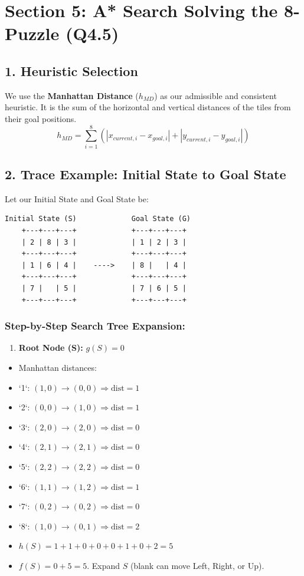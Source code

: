 \section{Section 5: A* Search Solving the 8-Puzzle (Q4.5)}

\subsection{1. Heuristic Selection}
We use the \textbf{Manhattan Distance} ($h_{MD}$) as our admissible and consistent heuristic. It is the sum of the horizontal and vertical distances of the tiles from their goal positions.
\[ h_{MD} = \sum_{i=1}^{8} \left( |x_{current, i} - x_{goal, i}| + |y_{current, i} - y_{goal, i}| \right) \]

\subsection{2. Trace Example: Initial State to Goal State}
Let our Initial State and Goal State be:
\begin{lstlisting}
Initial State (S)             Goal State (G)
    +---+---+---+             +---+---+---+
    | 2 | 8 | 3 |             | 1 | 2 | 3 |
    +---+---+---+             +---+---+---+
    | 1 | 6 | 4 |    ---->    | 8 |   | 4 |
    +---+---+---+             +---+---+---+
    | 7 |   | 5 |             | 7 | 6 | 5 |
    +---+---+---+             +---+---+---+
\end{lstlisting}

\subsubsection{Step-by-Step Search Tree Expansion:}

\begin{enumerate}
  \item \textbf{Root Node (S):} $g(S) = 0$
\end{enumerate}
\begin{itemize}
  \item   Manhattan distances:
  \item   `1`: $(1,0) \rightarrow (0,0) \Rightarrow \text{dist} = 1$
  \item   `2`: $(0,0) \rightarrow (1,0) \Rightarrow \text{dist} = 1$
  \item   `3`: $(2,0) \rightarrow (2,0) \Rightarrow \text{dist} = 0$
  \item   `4`: $(2,1) \rightarrow (2,1) \Rightarrow \text{dist} = 0$
  \item   `5`: $(2,2) \rightarrow (2,2) \Rightarrow \text{dist} = 0$
  \item   `6`: $(1,1) \rightarrow (1,2) \Rightarrow \text{dist} = 1$
  \item   `7`: $(0,2) \rightarrow (0,2) \Rightarrow \text{dist} = 0$
  \item   `8`: $(1,0) \rightarrow (0,1) \Rightarrow \text{dist} = 2$
  \item   $h(S) = 1+1+0+0+0+1+0+2 = 5$
  \item   $f(S) = 0 + 5 = 5$. Expand $S$ (blank can move Left, Right, or Up).
\end{itemize}


